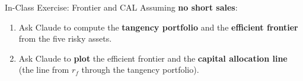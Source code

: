 \documentclass[aspectratio=169]{beamer}
\begin{document}
\begin{frame}{In-Class Exercise: Frontier and CAL}
Assuming \textbf{no short sales}:
\begin{enumerate}
  \item Ask Claude to compute the \textbf{tangency portfolio} and the \textbf{efficient frontier} from the five risky assets.
  \item Ask Claude to \textbf{plot} the efficient frontier and the \textbf{capital allocation line} (the line from $r_f$ through the tangency portfolio).
\end{enumerate}
\end{frame}
\end{document}
